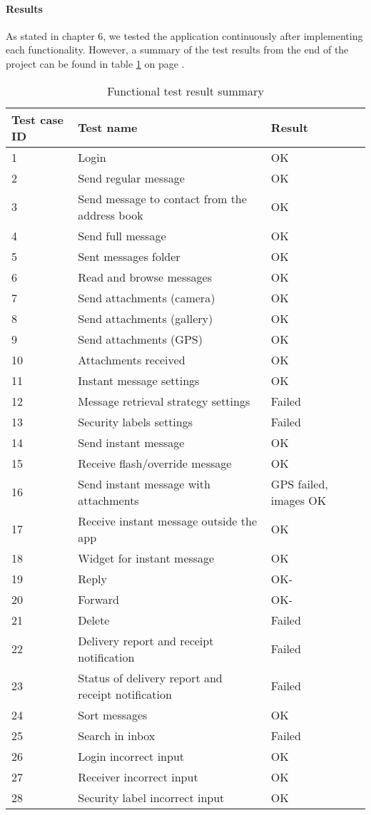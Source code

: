 \paragraph{Results}\hfill
\newline
As stated in chapter 6, we tested the application continuously after implementing each functionality. However, a summary of the test results from the end of the project can be found in table \ref{tab:caseresults} on page \pageref{tab:caseresults}.
\begin{table}[hbt]
\begin{center}
					\begin{tabular}{l|l|l}\hline
						\textbf{Test case ID} & \textbf{Test name} & \textbf{Result} \\ \hline \hline
						1&Login&OK\\
						2&Send regular message&OK\\
						3&Send message to contact from the address book&OK\\
						4&Send full message&OK\\
						5&Sent messages folder&OK\\
						6&Read and browse messages&OK\\
						7&Send attachments (camera)&OK\\
						8&Send attachments (gallery)&OK\\
						9&Send attachments (GPS)&OK\\
						10&Attachments received&OK\\
						11&Instant message settings&OK\\
						12&Message retrieval strategy settings&Failed\\
						13&Security labels settings&Failed\\
						14&Send instant message&OK\\
						15&Receive flash/override message&OK\\
						16&Send instant message with attachments&GPS failed, images OK\\
						17&Receive instant message outside the app&OK\\
						18&Widget for instant message&OK\\
						19&Reply&OK-\\
						20&Forward&OK-\\
						21&Delete&Failed\\
						22&Delivery report and receipt notification&Failed\\
						23&Status of delivery report and receipt notification&Failed\\
						24&Sort messages&OK\\
						25&Search in inbox&Failed\\	
						26&Login incorrect input&OK\\
						27&Receiver incorrect input&OK\\
						28&Security label incorrect input&OK\\ \hline
					\end{tabular}
\end{center}
\caption{Functional test result summary} \label{tab:caseresults}
\end{table}
